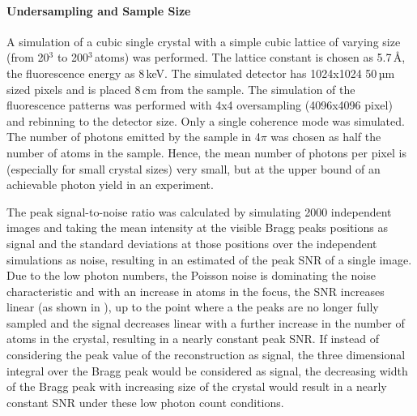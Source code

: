 
\paragraph{Undersampling and  Sample Size}


A simulation of a cubic single crystal with a simple cubic lattice of varying size (from 20$^3$ to 200$^3$\,atoms) was performed. The lattice constant is chosen as 5.7\,\AA, the fluorescence energy as 8\,keV. The simulated detector has 1024x1024 50\,µm sized pixels and is placed 8\,cm from the  sample. The simulation of the fluorescence patterns was performed with 4x4 oversampling (4096x4096 pixel) and rebinning to the detector size. Only a single coherence mode was simulated. The number of photons emitted by the sample in 4$\pi$ was chosen as half the number of atoms in the sample. Hence, the mean number of photons per pixel is (especially for small crystal sizes) very small, but at the upper bound of an achievable photon yield in an experiment.

The peak signal-to-noise ratio was calculated by simulating 2000 independent images  and taking the mean intensity at the visible Bragg peaks positions as signal and the standard deviations at those positions over the independent simulations as noise, resulting in an estimated of the peak SNR of a single image.
Due to the low photon numbers, the Poisson noise is dominating the noise characteristic and with an increase in atoms in the focus, the SNR increases linear (as shown in ), up to the point where a the peaks are no longer fully sampled and the signal decreases linear with a further increase in the number of atoms in the crystal, resulting in a nearly constant peak SNR.
If instead of considering the peak value of the reconstruction as signal, the three dimensional integral over the Bragg peak would be considered as signal, the decreasing width of the Bragg peak with increasing size of the crystal would result in a nearly constant SNR under these low photon count conditions. 



